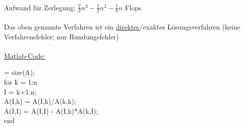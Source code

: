 \documentclass[4pt,a4paper]{scrartcl}
\begin{document}
\begin{multicols}{4}
\begin{equation*}
\end{equation*}
\\Aufwand für Zerlegung: $\frac{2}{3}n^3-\frac{1}{2}n^2-\frac{1}{6}n$ Flops\\\\
Das oben genannte Verfahren ist ein \underline{direktes}/exaktes Lösungsverfahren (keine Verfahrensfehler; nur Rundungsfehler)\\\\
\underline{Matlab-Code:}
\begin{tabbing}
[n,$\sim$] = size(A);\\
for \=k = 1:n\\
    \>I = k+1:n;\\
    \>A(I,k) = A(I,k)/A(k,k);\\
    \>A(I,I) = A(I,I) - A(I,k)*A(k,I);\\
end
\end{tabbing}


\end{multicols}
\end{document}
